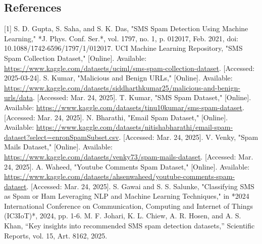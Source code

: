 \documentclass{article}
\begin{document}
\subsection*{References}
[1] S. D. Gupta, S. Saha, and S. K. Das, "SMS Spam Detection Using Machine Learning," *J. Phys. Conf. Ser.*, vol. 1797, no. 1, p. 012017, Feb. 2021, doi: 10.1088/1742-6596/1797/1/012017.
\newline
\newline
[2] UCI Machine Learning Repository, "SMS Spam Collection Dataset," [Online]. Available: \url{https://www.kaggle.com/datasets/uciml/sms-spam-collection-dataset}. [Accessed: 2025-03-24].
\newline
\newline
[3] S. Kumar, "Malicious and Benign URLs," [Online]. Available: \url{https://www.kaggle.com/datasets/siddharthkumar25/malicious-and-benign-urls/data}. [Accessed: Mar. 24, 2025].
\newline
\newline
[4] T. Kumar, "SMS Spam Dataset," [Online]. Available: \url{https://www.kaggle.com/datasets/tinu10kumar/sms-spam-dataset}. [Accessed: Mar. 24, 2025].
\newline
\newline
[5] N. Bharathi, "Email Spam Dataset," [Online]. Available: \url{https://www.kaggle.com/datasets/nitishabharathi/email-spam-dataset?select=enronSpamSubset.csv}. [Accessed: Mar. 24, 2025].
\newline
\newline
[6] V. Venky, "Spam Mails Dataset," [Online]. Available: \url{https://www.kaggle.com/datasets/venky73/spam-mails-dataset}. [Accessed: Mar. 24, 2025].
\newline
\newline
[7] A. Waheed, "Youtube Comments Spam Dataset," [Online]. Available: \url{https://www.kaggle.com/datasets/ahsenwaheed/youtube-comments-spam-dataset}. [Accessed: Mar. 24, 2025].
\newline
\newline
[8] S. Gawai and S. S. Salunke, "Classifying SMS as Spam or Ham Leveraging NLP and Machine Learning Techniques," in *2024 International Conference on Communication, Computing and Internet of Things (IC3IoT)*, 2024, pp. 1-6.
\newline
\newline
[9] M. F. Johari, K. L. Chiew, A. R. Hosen, and A. S. Khan, “Key insights into recommended SMS spam detection datasets,” Scientific Reports, vol. 15, Art. 8162, 2025.
\newline
\end{document}

